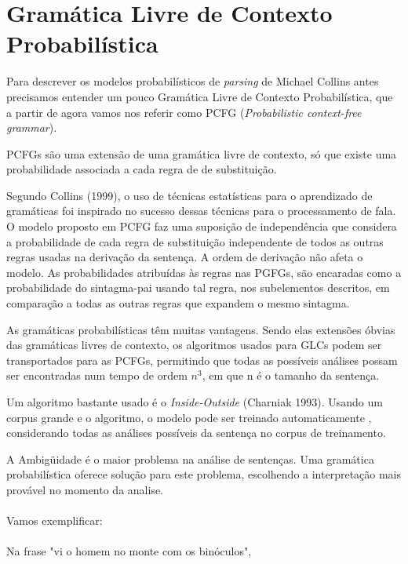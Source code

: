 \section{Gramática Livre de Contexto Probabilística}
\label{sec:pcfg}

Para descrever os modelos  probabilísticos  de \emph{parsing} de Michael Collins   antes precisamos entender um pouco Gramática Livre de Contexto Probabilística, que a partir de agora vamos nos referir como PCFG (\emph{Probabilistic context-free grammar}).

PCFGs são uma extensão de uma gramática livre de contexto, só que existe uma probabilidade associada a cada regra de de substituição.

Segundo Collins (1999), o uso de técnicas estatísticas para o aprendizado de gramáticas foi inspirado no sucesso dessas técnicas para o processamento de fala. O modelo proposto em PCFG faz uma suposição de independência que considera a probabilidade de cada regra de substituição independente de todos as outras regras usadas na derivação da sentença. A ordem de derivação não afeta o modelo. As probabilidades atribuídas às regras nas PGFGs, são encaradas como a probabilidade do sintagma-pai usando tal regra, nos subelementos descritos, em comparação a todas as outras regras que expandem o mesmo sintagma.

As gramáticas probabilísticas têm muitas vantagens. Sendo elas extensões óbvias das gramáticas livres de contexto, os algoritmos usados para GLCs podem ser transportados para as PCFGs, permitindo que todas as possíveis análises possam ser encontradas num tempo de ordem $n^3$, em que n é o tamanho da sentença.

Um algoritmo bastante usado é o \emph{Inside-Outside} (Charniak 1993). Usando um corpus grande e o algoritmo, o modelo pode ser treinado automaticamente , considerando todas as análises possíveis da sentença no corpus de treinamento.

A Ambigüidade é o maior problema na análise de sentenças. Uma gramática probabilística oferece solução para este problema, escolhendo a interpretação mais provável no momento da analise.
\\ \\
Vamos exemplificar:
\\ \\

Na frase "vi o homem no monte com os binóculos",
\\ \\


